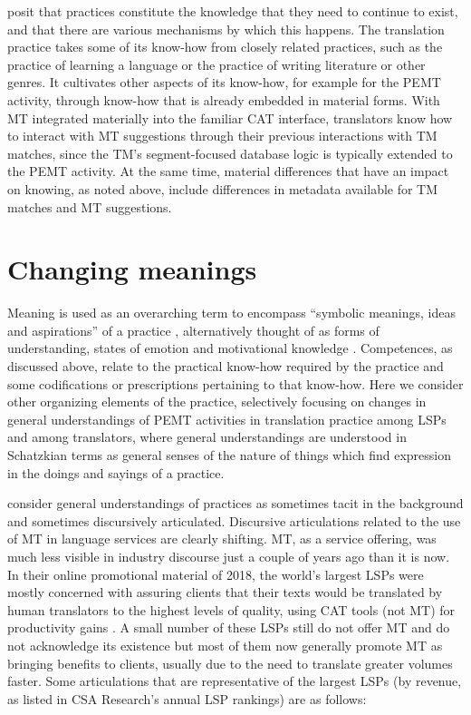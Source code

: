 \documentclass[output=paper,colorlinks,citecolor=brown]{langsci/langscibook}
\begin{document}
\citet{blue_how_2016} posit that practices constitute the knowledge that they need to continue to exist, and that there are various mechanisms by which this happens. The translation practice takes some of its know-how from closely related practices, such as the practice of learning a language or the practice of writing literature or other genres. It cultivates other aspects of its know-how, for example for the PEMT activity, through know-how that is already embedded in material forms. With MT integrated materially into the familiar CAT interface, translators know how to interact with MT suggestions through their previous interactions with TM matches, since the TM’s segment-focused database logic is typically extended to the PEMT activity. At the same time, material differences that have an impact on knowing, as noted above, include differences in metadata available for TM matches and MT suggestions. 


\section{Changing meanings}
Meaning is used as an overarching term to encompass \enquote{symbolic meanings, ideas and aspirations} of a practice \citep[14]{shove_dynamics_2012}, alternatively thought of as forms of understanding, states of emotion and motivational knowledge \citep[249]{reckwitz_toward_2002}. Competences, as discussed above, relate to the practical know-how required by the practice and some codifications or prescriptions pertaining to that know-how. Here we consider other organizing elements of the practice, selectively focusing on changes in general understandings of PEMT activities in translation practice among LSPs and among translators, where general understandings are understood in Schatzkian terms \citep[e.g.,][]{schatzki_site_2002} as general senses of the nature of things which find expression in the doings and sayings of a practice. 

\citet{welch_how_2017} consider general understandings of practices as sometimes tacit in the background and sometimes discursively articulated. Discursive articulations related to the use of MT in language services are clearly shifting. MT, as a service offering, was much less visible in industry discourse just a couple of years ago than it is now. In their online promotional material of 2018, the world’s largest LSPs were mostly concerned with assuring clients that their texts would be translated by human translators to the highest levels of quality, using CAT tools (not MT) for productivity gains \citep[76]{olohan_translation_2021}. A small number of these LSPs still do not offer MT and do not acknowledge its existence but most of them now generally promote MT as bringing benefits to clients, usually due to the need to translate greater volumes faster. Some articulations that are representative of the largest LSPs (by revenue, as listed in CSA Research’s annual LSP rankings) are as follows: 
\end{document}
